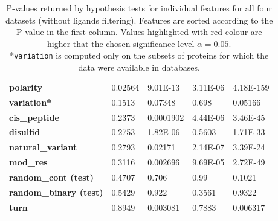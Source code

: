 \begin{table}[]
\begin{tabular}{lllll}
\textbf{polarity}             & 0.02564                        & 9.01E-13                        & 3.11E-06                       & 4.18E-159                       \\
\textbf{variation*}            & \cellcolor[HTML]{F54D4D}0.1513 & \cellcolor[HTML]{F54D4D}0.07348 & \cellcolor[HTML]{F54D4D}0.698  & \cellcolor[HTML]{F54D4D}0.05166 \\
\textbf{cis\_peptide}         & \cellcolor[HTML]{F54D4D}0.2373 & 0.0001902                       & 4.44E-06                       & 3.46E-45                        \\
\textbf{disulfid}             & \cellcolor[HTML]{F54D4D}0.2753 & 1.82E-06                        & \cellcolor[HTML]{F54D4D}0.5603 & 1.71E-33                        \\
\textbf{natural\_variant}     & \cellcolor[HTML]{F54D4D}0.2793 & 0.02171                         & 2.14E-07                       & 3.39E-24                        \\
\textbf{mod\_res}             & \cellcolor[HTML]{F54D4D}0.3116 & 0.002696                        & 9.69E-05                       & 2.72E-49                        \\
\textbf{random\_cont (test)}         & \cellcolor[HTML]{F54D4D}0.4707 & \cellcolor[HTML]{F54D4D}0.706   & \cellcolor[HTML]{F54D4D}0.99   & \cellcolor[HTML]{F54D4D}0.1021  \\
\textbf{random\_binary (test)}       & \cellcolor[HTML]{F54D4D}0.5429 & \cellcolor[HTML]{F54D4D}0.922   & \cellcolor[HTML]{F54D4D}0.3561 & \cellcolor[HTML]{F54D4D}0.9322  \\
\textbf{turn}                 & \cellcolor[HTML]{F54D4D}0.8949 & 0.003081                        & \cellcolor[HTML]{F54D4D}0.7883 & 0.006317                        \\ \hline
\end{tabular}
\caption{P-values returned by hypothesis tests for individual features for all four datasets (without ligands filtering). Features are sorted according to the P-value in the first column. Values highlighted with red colour are higher that the chosen significance level $\alpha = 0.05$.\\\hspace{\textwidth}
*\texttt{variation} is computed only on the subsets of proteins for which the data were available in databases.}
\label{tab:pvaluesAll}
\end{table}

